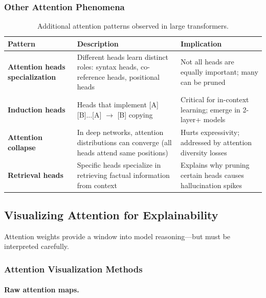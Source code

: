 \subsubsection{Other Attention Phenomena}
\label{other-attention-phenomena}

\begin{table}[ht!]
\centering
\caption{Additional attention patterns observed in large transformers.}
\begin{tabular}{@{}lp{5cm}p{6.5cm}@{}}
\toprule
\textbf{Pattern} & \textbf{Description} & \textbf{Implication} \\
\midrule
\textbf{Attention heads specialization} & Different heads learn distinct roles: syntax heads, co-reference heads, positional heads~\cite{voita2019analyzing} & Not all heads are equally important; many can be pruned \\
\textbf{Induction heads} & Heads that implement [A][B]...[A] $\to$ [B] copying~\cite{olsson2022context} & Critical for in-context learning; emerge in 2-layer+ models \\
\textbf{Attention collapse} & In deep networks, attention distributions can converge (all heads attend same positions) & Hurts expressivity; addressed by attention diversity losses \\
\textbf{Retrieval heads} & Specific heads specialize in retrieving factual information from context~\cite{wu2024retrieval} & Explains why pruning certain heads causes hallucination spikes \\
\bottomrule
\end{tabular}
\end{table}

\subsection{Visualizing Attention for Explainability}
\label{visualizing-attention-for-explainability}

Attention weights provide a window into model reasoning---but must be interpreted carefully.

\subsubsection{Attention Visualization Methods}
\label{attention-visualization-methods}

\paragraph{Raw attention maps.}
\label{raw-attention-maps.}

